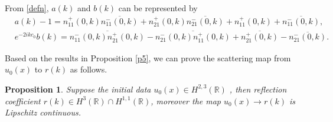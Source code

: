 \documentclass[11pt]{article}
\numberwithin{equation}{section}
\newtheorem{Proposition}{Proposition}
\begin{document}
From \eqref{defn},   $a(k)$ and $ b(k)$ can be  represented by
\begin{align}
&a(k)-1=n_{11}^+(0,k)\overline{n_{11}^-(0,k)}+n_{21}^+(0,k)\overline{n_{21}^-(0,k)}+n_{11}^+(0,k)+\overline{n_{11}^-(0,k)},\label{ak1}\qquad\quad\\
&e^{-2ikc_0}b(k)=\overline{n_{11}^-(0,k)n^+_{21}(0,k)}-\overline{n_{21}^-(0,k)n^+_{11}(0,k)}+\overline{n^+_{21}(0,k)}-\overline{n_{21}^-(0,k)}.\label{bk1}
\end{align}



 Based on the results in Proposition \ref{p5}, we can prove the scattering map from $u_0(x)$ to $r(k)$ as follows.



\begin{Proposition}\label{p4}
Suppose the initial data $u_0(x)\in H^{2,3}(\mathbb{R})$ , then reflection coefficient   $ r(k) \in H^3(\mathbb{R})\cap H^{1,1}(\mathbb{R})$, moreover the map $u_0(x) \to r(k)$ is Lipschitz continuous.
\end{Proposition}
\end{document}
